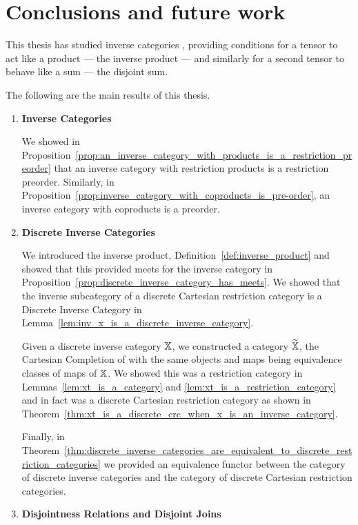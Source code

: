 \chapter{Conclusions and future work} %
\label{cha:conclusions_and_future_work}

This thesis has studied inverse categories \cite{cockett2002:restcategories1}, providing conditions
for a tensor to act like a product --- the inverse product --- and similarly for a second
tensor to behave like a sum --- the disjoint sum.

The following are the main results of this thesis.

\begin{enumerate}
\item \textbf{Inverse Categories}

We showed in Proposition~\ref{prop:an_inverse_category_with_products_is_a_restriction_preorder} that
an inverse category with restriction products is a restriction preorder. Similarly, in
Proposition~\ref{prop:inverse_category_with_coproducts_is_pre-order}, an inverse category with
coproducts is a preorder.

\item \textbf{Discrete Inverse Categories}

We introduced the inverse product, Definition~\ref{def:inverse_product} and showed that this
provided meets for the inverse category in
Proposition~\ref{prop:discrete_inverse_category_has_meets}. We showed that the inverse subcategory
of a discrete Cartesian restriction category is a Discrete Inverse Category in
Lemma~\ref{lem:inv_x_is_a_discrete_inverse_category}.

Given a discrete inverse category $\mathbb{X}$, we constructed a category $\widetilde{\mathbb{X}}$, the Cartesian Completion of
\X with the same objects and maps being equivalence classes of maps of $\mathbb{X}$. We showed this was a
restriction category in Lemmas~\ref{lem:xt_is_a_category} and \ref{lem:xt_is_a_restriction_category}
and in fact was a discrete Cartesian restriction category as shown in
Theorem~\ref{thm:xt_is_a_discrete_crc_when_x_is_an_inverse_category}.

Finally, in
Theorem~\ref{thm:discrete_inverse_categories_are_equivalent_to_discrete_restriction_categories} we
provided an equivalence functor between the category of discrete inverse categories and the category
of discrete Cartesian restriction categories.

\item \textbf{Disjointness Relations and Disjoint Joins}


\end{enumerate}
